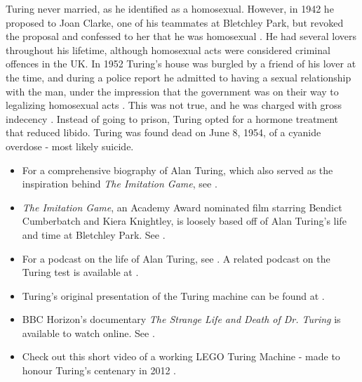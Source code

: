 \documentclass[../../../include/open-logic-section]{subfiles}
\begin{document}
Turing never married, as he identified as a homosexual. However, in 1942 he
proposed to Joan Clarke, one of his teammates at Bletchley Park, but
revoked the proposal and confessed to her that he was homosexual
\citep[259]{Hodges2014}. He had several lovers throughout his lifetime,
although homosexual acts were considered criminal offences in the UK. In
1952 Turing's house was burgled by a friend of his lover at the time, and
during a police report he admitted to having a sexual relationship with the
man, under the impression that the government was on their way to
legalizing homosexual acts \citep[575]{Hodges2014}. This was not true, and
he was charged with gross indecency \citep[576]{Hodges2014}. Instead of
going to prison, Turing opted for a hormone treatment that reduced libido.
Turing was found dead on June 8, 1954, of a cyanide overdose - most likely
suicide.

\begin{reading}
\begin{itemize} 
\item For a comprehensive biography of
Alan Turing, which also served as the inspiration behind \emph{The
Imitation Game}, see \citet{Hodges2014}.

\item \emph{The Imitation Game}, an Academy Award nominated film starring
Bendict Cumberbatch and Kiera Knightley, is loosely based off of Alan
Turing’s life and time at Bletchley Park. See \citet{Imitation2014}.

\item For a podcast on the life of Alan Turing, see \citet{Radiolab2012}. A
related podcast on the Turing test is available at \citet{RadiolabND}.

\item Turing's original presentation of the Turing machine can be found at
\citet{Turing1937}.

\item BBC Horizon's documentary \emph{The Strange Life and Death of Dr. 
Turing} is available to watch online. See \citet{Sykes1992}.

\item Check out this short video of a working LEGO Turing Machine -
made to honour Turing's centenary in 2012 \citep{Theelen2012}.

\end{itemize}

\end{reading}
\end{document}
